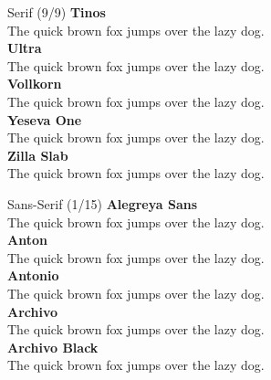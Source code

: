 \documentclass[10pt]{beamer}
\begin{document}
\begin{frame}{Serif (9/9)}
\vspace{-0.2cm}
  {\TinosLocal\Large\bfseries Tinos\\}
  {\TinosLocal The quick brown fox jumps over the lazy dog.\\[0.3cm]}
  {\UltraLocal\Large\bfseries Ultra\\}
  {\UltraLocal The quick brown fox jumps over the lazy dog.\\[0.3cm]}
  {\VollkornLocal\Large\bfseries Vollkorn\\}
  {\VollkornLocal The quick brown fox jumps over the lazy dog.\\[0.3cm]}
  {\YesevaOneLocal\Large\bfseries Yeseva One\\}
  {\YesevaOneLocal The quick brown fox jumps over the lazy dog.\\[0.3cm]}
  {\ZillaSlabLocal\Large\bfseries Zilla Slab\\}
  {\ZillaSlabLocal The quick brown fox jumps over the lazy dog.\\[0.3cm]}
\end{frame}

\begin{frame}{Sans-Serif (1/15)}
\vspace{-0.2cm}
  {\AlegreyaSansLocal\Large\bfseries Alegreya Sans\\}
  {\AlegreyaSansLocal The quick brown fox jumps over the lazy dog.\\[0.3cm]}
  {\AntonLocal\Large\bfseries Anton\\}
  {\AntonLocal The quick brown fox jumps over the lazy dog.\\[0.3cm]}
  {\AntonioLocal\Large\bfseries Antonio\\}
  {\AntonioLocal The quick brown fox jumps over the lazy dog.\\[0.3cm]}
  {\ArchivoLocal\Large\bfseries Archivo\\}
  {\ArchivoLocal The quick brown fox jumps over the lazy dog.\\[0.3cm]}
  {\ArchivoBlackLocal\Large\bfseries Archivo Black\\}
  {\ArchivoBlackLocal The quick brown fox jumps over the lazy dog.\\[0.3cm]}
\end{frame}
\end{document}
